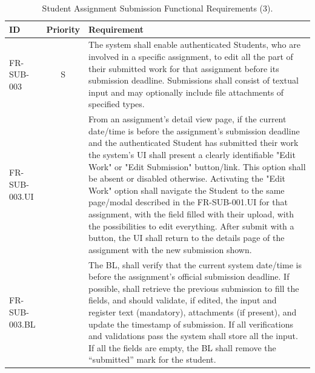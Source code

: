 \begin{table}[h]
    \centering
    \begin{tabular}{|l|c|p{10cm}|}
        \hline
        \textbf{ID} & \textbf{Priority} & \textbf{Requirement} \\
        \hline
        FR-SUB-003 & S & The system shall enable authenticated Students, who are involved in a specific assignment, to edit all the part of their submitted work for that assignment before its submission deadline. Submissions shall consist of textual input and may optionally include file attachments of specified types. \\
        \quad FR-SUB-003.UI &  & \quad From an assignment's detail view page, if the current date/time is before the assignment's submission deadline and the authenticated Student has submitted their work the system's UI shall present a clearly identifiable "Edit Work" or "Edit Submission" button/link. This option shall be absent or disabled otherwise. Activating the "Edit Work" option shall navigate the Student to the same page/modal described in the FR-SUB-001.UI for that assignment, with the field filled with their upload, with the possibilities to edit everything. After submit with a button, the UI shall return to the details page of the assignment with the new submission shown. \\
        \quad FR-SUB-003.BL &  & \quad The BL, shall verify that the current system date/time is before the assignment's official submission deadline. If possible, shall retrieve the previous submission to fill the fields, and should validate, if edited, the input and register text (mandatory), attachments (if present), and update the timestamp of submission. If all verifications and validations pass the system shall store all the input. If all the fields are empty, the BL shall remove the “submitted” mark for the student. \\
        \hline
    \end{tabular}
    \caption{Student Assignment Submission Functional Requirements (3).}
    \label{tab:StudentAssignmentSubmissionFR2}
\end{table}

